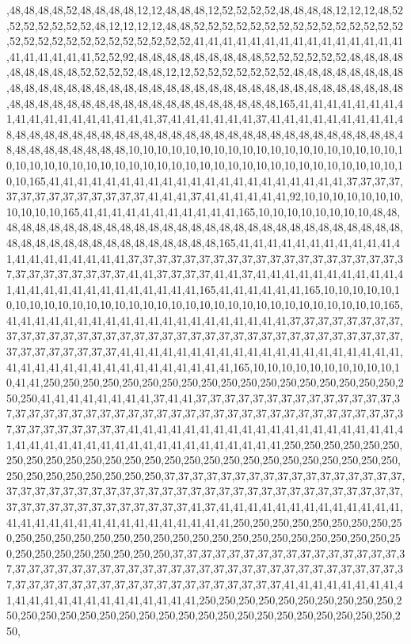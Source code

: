 ,48,48,48,48,52,48,48,48,48,12,12,48,48,48,12,52,52,52,52,48,48,48,48,12,12,12,48,52,52,52,52,52,52,52,48,12,12,12,12,48,48,52,52,52,52,52,52,52,52,52,52,52,52,52,52,52,52,52,52,52,52,52,52,52,52,52,52,52,52,41,41,41,41,41,41,41,41,41,41,41,41,41,41,41,41,41,41,41,41,41,52,52,92,48,48,48,48,48,48,48,48,48,52,52,52,52,52,52,48,48,48,48,48,48,48,48,48,52,52,52,52,48,48,12,12,52,52,52,52,52,52,52,48,48,48,48,48,48,48,48,48,48,48,48,48,48,48,48,48,48,48,48,48,48,48,48,48,48,48,48,48,48,48,48,48,48,48,48,48,48,48,48,48,48,48,48,48,48,48,48,48,48,48,48,48,48,48,165,41,41,41,41,41,41,41,41,41,41,41,41,41,41,41,41,41,41,37,41,41,41,41,41,41,37,41,41,41,41,41,41,41,41,41,48,48,48,48,48,48,48,48,48,48,48,48,48,48,48,48,48,48,48,48,48,48,48,48,48,48,48,48,48,48,48,48,48,48,48,48,48,10,10,10,10,10,10,10,10,10,10,10,10,10,10,10,10,10,10,10,10,10,10,10,10,10,10,10,10,10,10,10,10,10,10,10,10,10,10,10,10,10,10,10,10,10,10,10,10,10,165,41,41,41,41,41,41,41,41,41,41,41,41,41,41,41,41,41,41,41,41,41,37,37,37,37,37,37,37,37,37,37,37,37,37,37,41,41,41,37,41,41,41,41,41,41,92,10,10,10,10,10,10,10,10,10,10,10,165,41,41,41,41,41,41,41,41,41,41,41,165,10,10,10,10,10,10,10,10,48,48,48,48,48,48,48,48,48,48,48,48,48,48,48,48,48,48,48,48,48,48,48,48,48,48,48,48,48,48,48,48,48,48,48,48,48,48,48,48,48,48,48,48,48,165,41,41,41,41,41,41,41,41,41,41,41,41,41,41,41,41,41,41,41,41,37,37,37,37,37,37,37,37,37,37,37,37,37,37,37,37,37,37,37,37,37,37,37,37,37,37,37,37,41,41,37,37,37,37,41,41,37,41,41,41,41,41,41,41,41,41,41,41,41,41,41,41,41,41,41,41,41,41,41,41,41,165,41,41,41,41,41,41,165,10,10,10,10,10,10,10,10,10,10,10,10,10,10,10,10,10,10,10,10,10,10,10,10,10,10,10,10,10,10,10,10,165,41,41,41,41,41,41,41,41,41,41,41,41,41,41,41,41,41,41,41,41,37,37,37,37,37,37,37,37,37,37,37,37,37,37,37,37,37,37,37,37,37,37,37,37,37,37,37,37,37,37,37,37,37,37,37,37,37,37,37,37,37,37,37,37,41,41,41,41,41,41,41,41,41,41,41,41,41,41,41,41,41,41,41,41,41,41,41,41,41,41,41,41,41,41,41,41,41,41,41,41,165,10,10,10,10,10,10,10,10,10,10,10,41,41,250,250,250,250,250,250,250,250,250,250,250,250,250,250,250,250,250,250,250,250,41,41,41,41,41,41,41,41,37,41,41,37,37,37,37,37,37,37,37,37,37,37,37,37,37,37,37,37,37,37,37,37,37,37,37,37,37,37,37,37,37,37,37,37,37,37,37,37,37,37,37,37,37,37,37,37,37,37,37,37,37,37,41,41,41,41,41,41,41,41,41,41,41,41,41,41,41,41,41,41,41,41,41,41,41,41,41,41,41,41,41,41,41,41,41,41,41,41,41,41,41,250,250,250,250,250,250,250,250,250,250,250,250,250,250,250,250,250,250,250,250,250,250,250,250,250,250,250,250,250,250,250,250,250,250,37,37,37,37,37,37,37,37,37,37,37,37,37,37,37,37,37,37,37,37,37,37,37,37,37,37,37,37,37,37,37,37,37,37,37,37,37,37,37,37,37,37,37,37,37,37,37,37,37,37,37,37,37,37,37,37,37,37,41,37,41,41,41,41,41,41,41,41,41,41,41,41,41,41,41,41,41,41,41,41,41,41,41,41,41,41,41,41,41,250,250,250,250,250,250,250,250,250,250,250,250,250,250,250,250,250,250,250,250,250,250,250,250,250,250,250,250,250,250,250,250,250,250,250,250,250,37,37,37,37,37,37,37,37,37,37,37,37,37,37,37,37,37,37,37,37,37,37,37,37,37,37,37,37,37,37,37,37,37,37,37,37,37,37,37,37,37,37,37,37,37,37,37,37,37,37,37,37,37,37,37,37,37,37,37,37,37,37,37,37,41,41,41,41,41,41,41,41,41,41,41,41,41,41,41,41,41,41,41,41,41,41,250,250,250,250,250,250,250,250,250,250,250,250,250,250,250,250,250,250,250,250,250,250,250,250,250,250,250,250,250,250,250,
